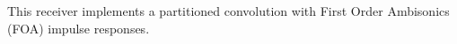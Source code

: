 This receiver implements a partitioned convolution with First Order
Ambisonics (FOA) impulse responses.


